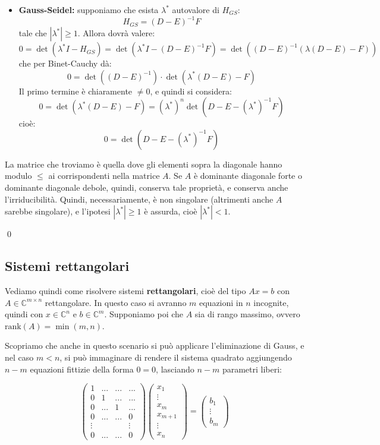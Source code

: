 \documentclass[a4paper,11pt]{article}
\begin{document}
\begin{enumerate}
\begin{itemize}
\item \textbf{Gauss-Seidel:} supponiamo che esista $\lambda^*$ autovalore di $H_{GS}$:
$$
H_{GS} = (D - E)^{-1} F
$$
tale che $|\lambda^*| \geq 1$.
Allora dovrà valere:
$$
0 = \det(\lambda^* I - H_{GS}) = \det\left (\lambda^* I - (D - E)^{-1} F \right) = \det \left( (D- E)^{-1} \left( \lambda(D - E) - F \right) \right)
$$
che per Binet-Cauchy dà:
$$
0 = \det \left( (D - E)^{-1} \right) \cdot \det \left(\lambda^* (D - E) - F \right)
$$
Il primo termine è chiaramente $\neq 0$, e quindi si considera:
$$
0 = \det \left( \lambda^* (D - E) - F \right) = \left(\lambda^*\right)^n \det \left(D - E - (\lambda^*)^{-1} F \right)
$$
cioè:
$$
0 = \det \left(D - E - (\lambda^*)^{-1} F \right)
$$
\end{itemize}
La matrice che troviamo è quella dove gli elementi sopra la diagonale hanno modulo $\leq$ ai corrispondenti nella matrice $A$.
Se $A$ è dominante diagonale forte o dominante diagonale debole, quindi, conserva tale proprietà, e conserva anche l'irriducibilità.
Quindi, necessariamente, è non singolare (altrimenti anche $A$ sarebbe singolare), e l'ipotesi $|\lambda^*| \geq 1$ è assurda, cioè $|\lambda^*| < 1$.
\end{enumerate} \qed

\subsection{Sistemi rettangolari}
Vediamo quindi come risolvere sistemi \textbf{rettangolari}, cioè del tipo $Ax = b$ con $A \in \mathbb{C}^{m \times n}$ rettangolare.
In questo caso si avranno $m$ equazioni in $n$ incognite, quindi con $x \in \mathbb{C}^n$ e $b \in \mathbb{C}^m$.
Supponiamo poi che $A$ sia di rango massimo, ovvero $\mathrm{rank}(A) = \min(m, n)$.

Scopriamo che anche in questo scenario si può applicare l'eliminazione di Gauss, e nel caso $m < n$, si può immaginare di rendere il sistema quadrato aggiungendo $n - m$ equazioni fittizie della forma $0 = 0$, lasciando $n - m$ parametri liberi:

$$
\begin{pmatrix}
	1 & ... & ... & ... \\ 
	0 & 1 & ... & ... \\ 
	0 & ... & 1 & ... \\
	0 & ... & ... & 0 \\ 
	\vdots & & & \vdots \\ 
	0 & ... & ... & 0
\end{pmatrix}
\begin{pmatrix}
	x_1 \\ \vdots \\ x_m \\ x_{m + 1} \\ \vdots \\ x_n
\end{pmatrix}
=
\begin{pmatrix}
	b_1 \\ \vdots \\ b_m
\end{pmatrix}
$$
\end{document}
